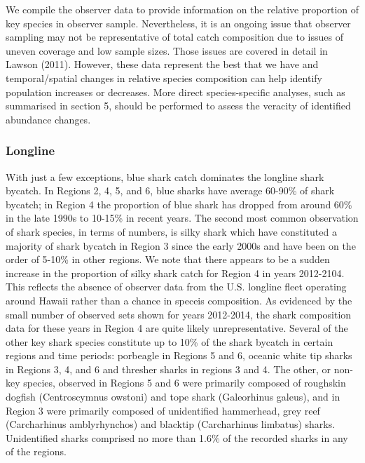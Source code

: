 \documentclass[12pt]{SCreport}
\begin{document}
We compile the observer data to provide information on the relative proportion of key species in observer sample. Nevertheless, it is an ongoing issue that observer sampling may not be representative of total catch composition due to issues of uneven coverage and low sample sizes. Those issues are covered in detail in Lawson (2011). However, these data represent the best that we have and temporal/spatial changes in relative species composition can help identify population increases or decreases. More direct species-specific analyses, such as summarised in section 5, should be performed to assess the veracity of identified abundance changes.

      
  \subsubsection{Longline}  
  
With just a few exceptions, blue shark catch dominates the longline shark bycatch.  In Regions 2, 4, 5, and 6, blue sharks have average 60-90\% of shark bycatch; in Region 4 the proportion of blue shark has dropped from around 60\% in the late 1990s to 10-15\% in recent years.  The second most common observation of shark species, in terms of numbers, is silky shark which have constituted a majority of shark bycatch in Region 3 since the early 2000s and have been on the order of 5-10\% in other regions.  We note that there appears to be a sudden increase in the proportion of silky shark catch for Region 4 in years 2012-2104.  This reflects the absence of observer data from the U.S. longline fleet operating around Hawaii rather than a chance in speceis composition.  As evidenced by the small number of observed sets shown for years 2012-2014, the shark composition data for these years in Region 4 are quite likely unrepresentative.  Several of the other key shark species constitute up to 10\% of the shark bycatch in certain regions and time periods: porbeagle in Regions 5 and 6, oceanic white tip sharks in Regions 3, 4, and 6 and thresher sharks in regions 3 and 4.  The other, or non-key species, observed in Regions 5 and 6 were primarily composed of roughskin dogfish (Centroscymnus owstoni) and tope shark (Galeorhinus galeus), and in Region 3 were primarily composed of unidentified hammerhead, grey reef (Carcharhinus amblyrhynchos) and blacktip (Carcharhinus limbatus) sharks. Unidentified sharks comprised no more than 1.6\% of the recorded sharks in any of the regions.
\end{document}
